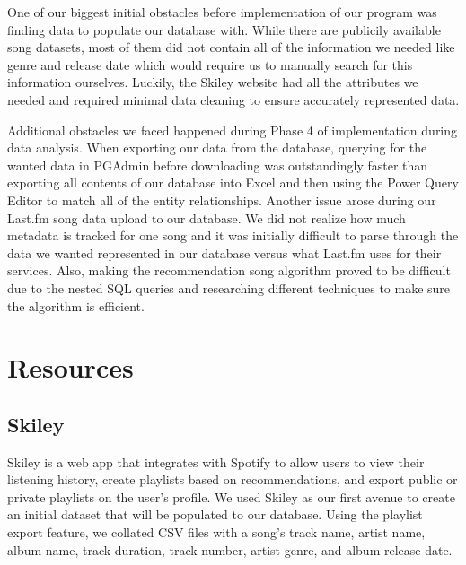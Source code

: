 \documentclass[12pt]{article}
\begin{document}
    \vspace{0.5cm}

    \noindent One of our biggest initial obstacles before implementation of our program was finding
    data to populate our database with. While there are publicily available song datasets,
    most of them did not contain all of the information we needed like genre and release date
    which would require us to manually search for this information ourselves. Luckily, the
    Skiley website had all the attributes we needed and required minimal data cleaning to
    ensure accurately represented data.

    \vspace{0.5cm}

    \noindent Additional obstacles we faced happened during Phase 4 of implementation during data analysis.
    When exporting our
    data from the database, querying for the wanted data in PGAdmin before downloading was
    outstandingly faster than exporting all contents of our database into Excel and then
    using the Power Query Editor to match all of the entity relationships. Another issue
    arose during our Last.fm song data upload to our database. We did not realize how much
    metadata is tracked for one song and it was initially
    difficult to parse through the data we wanted represented in our database versus what Last.fm
    uses for their services. Also, making the recommendation song algorithm proved to be
    difficult due to the nested SQL queries and researching different techniques to make sure
    the algorithm is efficient.

    \section{Resources}

    \subsection{Skiley}
    Skiley is a web app that integrates with Spotify to allow users to view their listening history,
    create playlists based on recommendations, and export public or private playlists on the user's profile.
    We used Skiley as our first avenue to create an initial dataset that will be populated to our database.
    Using the playlist export feature, we collated CSV files with a song's track name, artist name, album name,
    track duration, track number, artist genre, and album release date.
\end{document}
